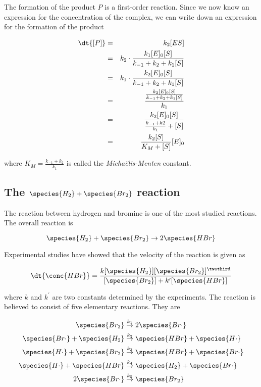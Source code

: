 The formation of the product $P$ is a first-order reaction. Since we now know an expression for the concentration of the complex, we can write down an expression for the formation of the product \ie

\begin{eqnarray*}
    \dt{[P]} &=& k_2 [ES] \\
             &=& k_2 \cdot \frac{k_1[E]_0[S]}{k_{-1}+k_2+k_1[S]}   \\
             &=& k_1 \cdot \frac{k_2[E]_0[S]}{k_{-1}+k_2+k_1[S]}   \\
             &=& \frac{\frac{k_2[E]_0[S]}{k_{-1}+k_2+k_1[S]}}{k_1} \\
             &=& \frac{k_2[E]_0[S]}{\frac{k_{-1}+k2}{k_1}+[S]}      \\
             &=& \frac{k_2[S]}{K_M + [S]}[E]_0
\end{eqnarray*}

where $K_M = \frac{k_{-1}+k_2}{k_1}$ is called the \textit{Michaëlis-Menten} constant.

\subsection{The $\species{H_2} + \species{Br_2}$ reaction}

The reaction between hydrogen and bromine is one of the most studied reactions. The overall reaction is

\begin{equation}
    \species{H_2} + \species{Br_2} \rightarrow 2 \species{HBr}
\end{equation}

Experimental studies have showed that the velocity of the reaction is given as

\begin{equation}
    \dt{\conc{HBr}} = \frac{k[\species{H_2}][\species{Br_2}]^\twothird}{[\species{Br_2}] + k^\prime [\species{HBr}]}
\end{equation}

where $k$ and $k^\prime$ are two constants determined by the experiments. The reaction is believed to consist of five elementary reactions. They are

\begin{subequations}
  \begin{align}
    \species{Br_2}                         &\overset{k_1}{\rightarrow}     2\species{Br\cdot} \\
    \species{Br\cdot} + \species{H_2}      &\overset{k_2}{\rightarrow}     \species{HBr} + \species{H\cdot} \\
    \species{H\cdot} + \species{Br_2}      &\overset{k_3}{\rightarrow}     \species{HBr} + \species{Br\cdot} \\
    \species{H\cdot} + \species{HBr}       &\overset{k_4}{\rightarrow}     \species{H_2} + \species{Br\cdot} \\
    2\species{Br\cdot}                     &\overset{k_5}{\rightarrow}     \species{Br_2}
  \end{align}
\end{subequations}

